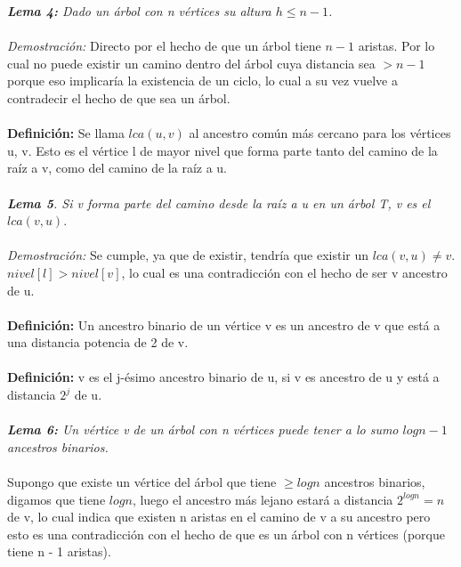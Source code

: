 \documentclass[12pt]{article}
\begin{document}
\textit{\textbf{Lema 4:} Dado un \'arbol con n v\'ertices su altura $h \leq n - 1$.}\\
\\

\textit{Demostraci\'on:} Directo por el hecho de que un \'arbol tiene $n-1$ aristas. Por lo cual no puede existir un camino dentro del \'arbol cuya distancia sea $ > n-1$ porque eso implicar\'ia la existencia de un ciclo, lo cual a su vez vuelve a contradecir el hecho de que sea un \'arbol.\\
\\



\textbf{Definici\'on:} Se llama $lca(u,v)$ al ancestro com\'un m\'as cercano para los v\'ertices u, v.  Esto es el v\'ertice l de mayor nivel que forma parte tanto del camino de la ra\'iz a v, como del camino de la ra\'iz a u.\\
\\



\textit{ \textbf {Lema 5}. Si v forma parte del camino desde la ra\'iz a u en un \'arbol T, v es el $lca(v,u)$}.\\
\\
\textit{Demostración:} Se cumple, ya que de existir,  tendr\'ia que existir un $lca (v, u) \neq v$. $nivel[l] > nivel [v]$, lo cual es una contradicci\'on con el hecho de ser v ancestro de u.\\
\\




\textbf{Definici\'on:} Un ancestro binario de un v\'ertice v es un ancestro de v que est\'a a una distancia potencia de 2 de v.\\
\\


\textbf{Definici\'on:} v es el j-\'esimo ancestro binario de u, si v es ancestro de u y est\'a a distancia $2^j$ de u.\\
\\


\textit{ \textbf{ Lema 6:} Un v\'ertice v de un \'arbol con n v\'ertices puede tener a lo sumo $log n - 1$ ancestros binarios.}\\
\\
Supongo que existe un v\'ertice del \'arbol que tiene $\geq log n$ ancestros binarios, digamos que tiene $log n$, luego el ancestro m\'as lejano estar\'a a distancia  $2^{log n} = n$ de v, lo cual indica que existen n aristas en el camino de v a su ancestro pero esto es una contradicci\'on con el hecho de que es un \'arbol con n v\'ertices (porque tiene n - 1 aristas).\\
\\
\end{document}
